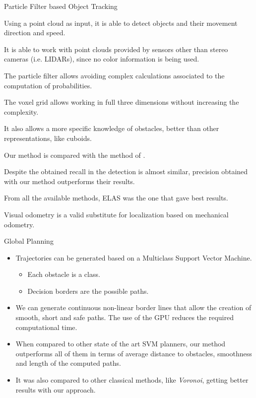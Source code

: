 \begin{frame}{Particle Filter based Object Tracking}
  \small
  \begin{itemize}
   {
    \item Using a point cloud as input, it is able to detect objects and their movement direction and speed.
    \item It is able to work with point clouds provided by sensors other than stereo cameras (i.e. LIDARs), since no color information is being used. 
    \item The particle filter allows avoiding complex calculations associated to the computation of probabilities.
    \item The voxel grid allows working in full three dimensions without increasing the complexity. 
    \item It also allows a more specific knowledge of obstacles, better than other representations, like cuboids.
    }
     {
    \item Our method is compared with the method of \cite{danescu2012particle}.
    \item Despite the obtained recall in the detection is almost similar, precision obtained with our method outperforms their results. 
    \item From all the available methods, ELAS was the one that gave best results.
    \item Visual odometry \citep{geiger2011stereoscan} is a valid substitute for localization based on mechanical odometry.
    }
  \end{itemize}
\end{frame}

\begin{frame}{Global Planning}
  \small
  \begin{itemize}
    \item Trajectories can be generated based on a Multiclass Support Vector Machine.
    \begin{itemize}
     \item Each obstacle is a class.
     \item Decision borders are the possible paths. 
    \end{itemize}
    \item We can generate continuous non-linear border lines that allow the creation of smooth, short and safe paths. The use of the GPU reduces the required computational time.
    \item When compared to other state of the art SVM planners, our method outperforms all of them in terms of average distance to obstacles, smoothness and length of the computed paths. 
    \item It was also compared to other classical methods, like \emph{Voronoi}, getting better results with our approach.
  \end{itemize}
\end{frame}

